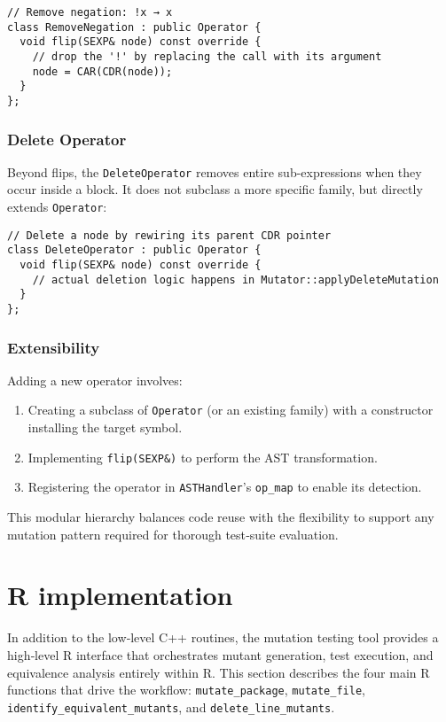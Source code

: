 \begin{verbatim}
// Remove negation: !x → x
class RemoveNegation : public Operator {
  void flip(SEXP& node) const override {
    // drop the '!' by replacing the call with its argument
    node = CAR(CDR(node));
  }
};
\end{verbatim}

\subsubsection{Delete Operator}

Beyond flips, the \texttt{DeleteOperator} removes entire sub-expressions when they occur inside a block. It does not subclass a more specific family, but directly extends \texttt{Operator}:

\begin{verbatim}
// Delete a node by rewiring its parent CDR pointer
class DeleteOperator : public Operator {
  void flip(SEXP& node) const override {
    // actual deletion logic happens in Mutator::applyDeleteMutation
  }
};
\end{verbatim}

\subsubsection{Extensibility}

Adding a new operator involves:

\begin{enumerate}
  \item Creating a subclass of \texttt{Operator} (or an existing family) with a constructor installing the target symbol.
  \item Implementing \texttt{flip(SEXP\&)} to perform the AST transformation.
  \item Registering the operator in \texttt{ASTHandler}’s \texttt{op_map} to enable its detection.
\end{enumerate}

This modular hierarchy balances code reuse with the flexibility to support any mutation pattern required for thorough test‐suite evaluation.

\section{R implementation}

In addition to the low‐level C++ routines, the mutation testing tool provides a high‐level R interface that orchestrates mutant generation, test execution, and equivalence analysis entirely within R.  This section describes the four main R functions that drive the workflow: \texttt{mutate\_package}, \texttt{mutate\_file}, \texttt{identify\_equivalent\_mutants}, and \texttt{delete\_line\_mutants}.

